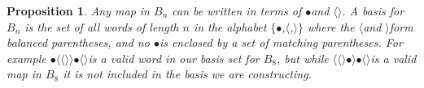 \documentclass[11pt]{article} %
\newcommand{\lcap}{\boldmath$\langle$\unboldmath}
\newcommand{\rcap}{\boldmath$\rangle$\unboldmath}
\newcommand{\dotmap}{$\bullet$}
\begin{document}
\newtheorem*{proposition}{Proposition}
\begin{proposition}
Any map in $B_n$ can be written in terms of \dotmap\hspace{1mm}and \lcap\rcap. A basis for $B_n$ is the set of all words of length $n$ in the alphabet $\{$\dotmap,\lcap,\rcap$\}$ where the \lcap\hspace{1mm}and \rcap\hspace{1mm}form balanced parentheses, and no \dotmap\hspace{1.25mm}is enclosed by a set of matching parentheses.  For example \dotmap\lcap\lcap\rcap\rcap\dotmap\lcap\rcap\hspace{1mm}is a valid word in our basis set for $B_8$, but while \lcap\lcap\rcap\dotmap\rcap\dotmap\lcap\rcap\hspace{1mm}is a valid map in $B_8$ it is not included in the basis we are constructing.
\end{proposition}
\end{document}
